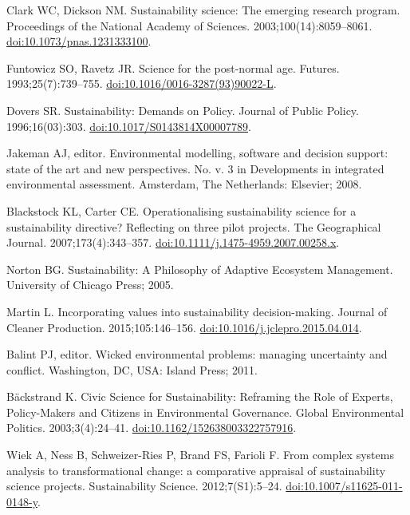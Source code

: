 \documentclass[10pt,a4paper]{article}
\begin{document}
\begin{multicols}{2}
\begin{footnotesize}
\begin{thebibliography}{100}
Clark WC, Dickson NM.
\newblock Sustainability science: {The} emerging research program.
\newblock Proceedings of the National Academy of Sciences.
  2003;100(14):8059--8061.
\newblock
  \href{https://doi.org/10.1073/pnas.1231333100}{doi:10.1073/pnas.1231333100}.

Funtowicz SO, Ravetz JR.
\newblock Science for the post-normal age.
\newblock Futures. 1993;25(7):739--755.
\newblock
  \href{https://doi.org/10.1016/0016-3287(93)90022-L}{doi:10.1016/0016-3287(93)90022-L}.

Dovers SR.
\newblock Sustainability: {Demands} on {Policy}.
\newblock Journal of Public Policy. 1996;16(03):303.
\newblock
  \href{https://doi.org/10.1017/S0143814X00007789}{doi:10.1017/S0143814X00007789}.

Jakeman AJ, editor.
\newblock Environmental modelling, software and decision support: state of the
  art and new perspectives.
\newblock No. v. 3 in Developments in integrated environmental assessment.
  Amsterdam, The Netherlands: Elsevier; 2008.

Blackstock KL, Carter CE.
\newblock Operationalising sustainability science for a sustainability
  directive? {Reflecting} on three pilot projects.
\newblock The Geographical Journal. 2007;173(4):343--357.
\newblock
  \href{https://doi.org/10.1111/j.1475-4959.2007.00258.x}{doi:10.1111/j.1475-4959.2007.00258.x}.

Norton BG.
\newblock Sustainability: {A} {Philosophy} of {Adaptive} {Ecosystem}
  {Management}.
\newblock University of Chicago Press; 2005.

Martin L.
\newblock Incorporating values into sustainability decision-making.
\newblock Journal of Cleaner Production. 2015;105:146--156.
\newblock
  \href{https://doi.org/10.1016/j.jclepro.2015.04.014}{doi:10.1016/j.jclepro.2015.04.014}.

Balint PJ, editor.
\newblock Wicked environmental problems: managing uncertainty and conflict.
\newblock Washington, DC, USA: Island Press; 2011.

Bäckstrand K.
\newblock Civic Science for Sustainability: Reframing the Role of Experts,
  Policy-Makers and Citizens in Environmental Governance.
\newblock Global Environmental Politics. 2003;3(4):24--41.
\newblock
  \href{https://doi.org/10.1162/152638003322757916}{doi:10.1162/152638003322757916}.

Wiek A, Ness B, Schweizer-Ries P, Brand FS, Farioli F.
\newblock From complex systems analysis to transformational change: a
  comparative appraisal of sustainability science projects.
\newblock Sustainability Science. 2012;7(S1):5--24.
\newblock
  \href{https://doi.org/10.1007/s11625-011-0148-y}{doi:10.1007/s11625-011-0148-y}.


\end{thebibliography}
\end{footnotesize}
\end{multicols}
\end{document}

